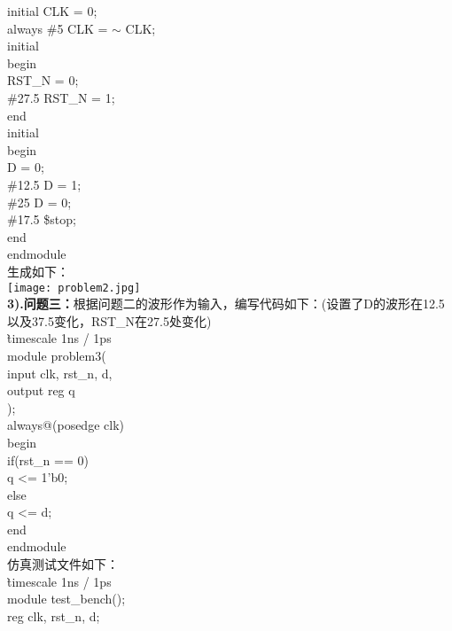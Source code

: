 \documentclass[12pt]{ctexart}
\begin{document}
initial CLK = 0;\\
always  \#5 CLK = $\sim$ CLK;\\
initial \\
begin\\
\hspace*{0.5cm}RST\_N = 0;\\
\hspace*{0.5cm}\#27.5 RST\_N = 1;\\
end\\
initial\\
begin\\
\hspace*{0.5cm}D = 0;\\
\hspace*{0.5cm}\#12.5 D = 1;\\
\hspace*{0.5cm}\#25 D = 0;\\
\hspace*{0.5cm}\#17.5 \$stop;\\
end\\
endmodule\\
生成如下：\\
\texttt{[image: problem2.jpg]}\\
{\bf3).问题三：}根据问题二的波形作为输入，编写代码如下：(设置了D的波形在12.5以及37.5变化，RST\_N在27.5处变化)\\
\`timescale 1ns / 1ps\\
module problem3(\\
input clk, rst\_n, d,\\
output reg q\\
\hspace*{0.5cm});\\
always@(posedge clk)\\
begin\\
\hspace*{0.5cm}if(rst\_n == 0)\\
\hspace*{1cm}q <=  1'b0;\\
\hspace*{0.5cm}else \\
\hspace*{1cm}q <= d;\\
end\\
endmodule\\
仿真测试文件如下：\\
\`timescale 1ns / 1ps\\
module test\_bench();\\
reg clk, rst\_n, d;\\
\end{document}
